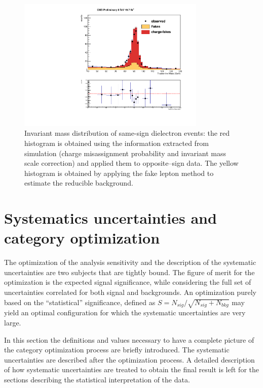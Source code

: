 \begin{figure}
  \begin{center}
  \includegraphics[width=0.8\textwidth]{4_Analisys/pics/8TeV/plots/zee/EE_Charge_Flip_xcheck_trk_invMass.pdf}
  \caption{Invariant mass distribution of same-sign dielectron events: the red histogram is obtained using the information extracted from simulation
(charge misassignment probability and invariant mass scale correction) and applied them to opposite--sign data. The yellow histogram is obtained by applying the fake lepton method to estimate the reducible background.}
  \label{fig:control_Zee}
  \end{center}
\end{figure}

\section{Systematics uncertainties and category optimization}
\label{sec:systematics}

The optimization of the analysis sensitivity and the description of the systematic uncertainties are two subjects that are tightly bound. The figure of merit for %
the optimization is the expected signal significance, while considering the full set of uncertainties correlated for both signal and backgrounds. An optimization purely based on the ``statistical'' significance, defined as $S = N_{sig} / \sqrt{N_{sig} + N_{bkg}}$ may yield an optimal configuration for which the systematic uncertainties are very large.

In this section the definitions and values necessary to have a complete picture of the category optimization process are briefly introduced. The systematic uncertainties are described after the optimization process.
A detailed description of how systematic uncertainties are treated to obtain the final result is left for the sections describing the statistical interpretation of the data.

